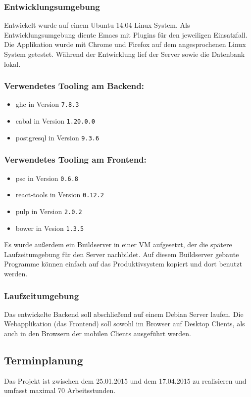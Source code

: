 \subsubsection{Entwicklungsumgebung}
Entwickelt wurde auf einem Ubuntu 14.04 Linux System. Als Entwicklungsumgebung diente Emacs mit Plugins für den jeweiligen Einsatzfall. Die Applikation wurde mit Chrome und Firefox auf dem angesprochenen Linux System getestet. Während der Entwicklung lief der Server sowie die Datenbank lokal.
\subsubsection*{Verwendetes Tooling am Backend:}
\begin{itemize}
\item \gls{ghc} in Version \texttt{7.8.3}
\item \gls{cabal} in Version \texttt{1.20.0.0}
\item \gls{postgresql} in Version \texttt{9.3.6}
\end{itemize}

\subsubsection*{Verwendetes Tooling am Frontend:}
\begin{itemize}
\item \gls{psc} in Version \texttt{0.6.8}
\item \gls{react-tools} in Version \texttt{0.12.2}
\item \gls{pulp} in Version \texttt{2.0.2}
\item \gls{bower} in Vesion \texttt{1.3.5}
\end{itemize}
Es wurde außerdem ein Buildserver in einer VM aufgesetzt, der die spätere Laufzeitumgebung für den Server nachbildet. Auf diesem Buildserver gebaute Programme können einfach auf das Produktivsystem kopiert und dort benutzt werden.
\subsubsection{Laufzeitumgebung}
Das entwickelte Backend soll abschließend auf einem Debian Server laufen. Die Webapplikation (das Frontend) soll sowohl im Browser auf Desktop Clients, als auch in den Browsern der mobilen Clients ausgeführt werden.
\subsection{Terminplanung}
Das Projekt ist zwischen dem 25.01.2015 und dem 17.04.2015 zu realisieren und umfasst maximal 70 Arbeitsstunden.
